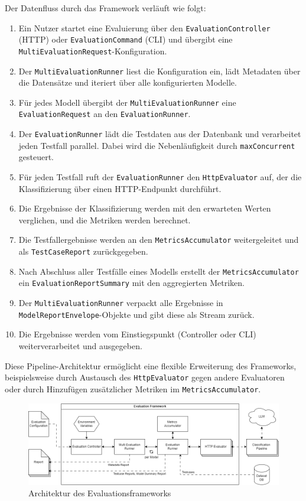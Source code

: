 Der Datenfluss durch das Framework verläuft wie folgt:

\begin{enumerate}
    \item Ein Nutzer startet eine Evaluierung über den \texttt{EvaluationController} (HTTP) oder \texttt{EvaluationCommand} (CLI) und übergibt eine \texttt{MultiEvaluationRequest}-Konfiguration.
    \item Der \texttt{MultiEvaluationRunner} liest die Konfiguration ein, lädt Metadaten über die Datensätze und iteriert über alle konfigurierten Modelle.
    \item Für jedes Modell übergibt der \texttt{MultiEvaluationRunner} eine \texttt{EvaluationRequest} an den \texttt{EvaluationRunner}.
    \item Der \texttt{EvaluationRunner} lädt die Testdaten aus der Datenbank und verarbeitet jeden Testfall parallel. Dabei wird die Nebenläufigkeit durch \texttt{maxConcurrent} gesteuert.
    \item Für jeden Testfall ruft der \texttt{EvaluationRunner} den \texttt{HttpEvaluator} auf, der die Klassifizierung über einen HTTP-Endpunkt durchführt.
    \item Die Ergebnisse der Klassifizierung werden mit den erwarteten Werten verglichen, und die Metriken werden berechnet.
    \item Die Testfallergebnisse werden an den \texttt{MetricsAccumulator} weitergeleitet und als \texttt{TestCaseReport} zurückgegeben.
    \item Nach Abschluss aller Testfälle eines Modells erstellt der \texttt{MetricsAccumulator} ein \texttt{EvaluationReportSummary} mit den aggregierten Metriken.
    \item Der \texttt{MultiEvaluationRunner} verpackt alle Ergebnisse in \texttt{ModelReportEnvelope}-Objekte und gibt diese als Stream zurück.
    \item Die Ergebnisse werden vom Einstiegspunkt (Controller oder CLI) weiterverarbeitet und ausgegeben.
\end{enumerate}

Diese Pipeline-Architektur ermöglicht eine flexible Erweiterung des Frameworks, beispielsweise durch Austausch des \texttt{HttpEvaluator} gegen andere Evaluatoren oder durch Hinzufügen zusätzlicher Metriken im \texttt{MetricsAccumulator}.

\begin{figure}
    \centering
    \includegraphics[width=.9\linewidth]{images/evaluation/evaluation-framework-architecture}
    \caption{Architektur des Evaluationsframeworks}
    \label{fig:evaluation-framework-architecture}
\end{figure}